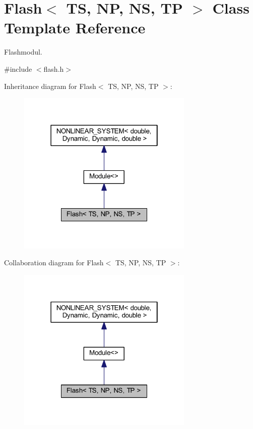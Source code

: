 \hypertarget{class_flash}{}\section{Flash$<$ TS, NP, NS, TP $>$ Class Template Reference}
\label{class_flash}


Flashmodul.  




{\ttfamily \#include $<$flash.\+h$>$}



Inheritance diagram for Flash$<$ TS, NP, NS, TP $>$\+:\nopagebreak
\begin{figure}[H]
\begin{center}
\leavevmode
\includegraphics[width=238pt]{class_flash__inherit__graph}
\end{center}
\end{figure}


Collaboration diagram for Flash$<$ TS, NP, NS, TP $>$\+:\nopagebreak
\begin{figure}[H]
\begin{center}
\leavevmode
\includegraphics[width=238pt]{class_flash__coll__graph}
\end{center}
\end{figure}
